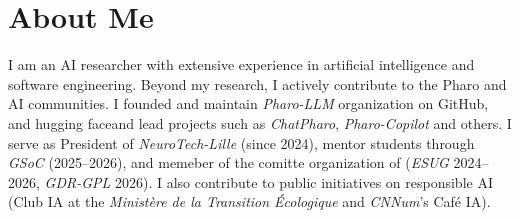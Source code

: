 \section{About Me}
I am an AI researcher with extensive experience in artificial intelligence and software engineering.
Beyond my research, I actively contribute to the Pharo and AI communities. I founded and maintain \textit{Pharo-LLM} organization on GitHub, and
hugging faceand lead projects such as \textit{ChatPharo}, \textit{Pharo-Copilot} and others. I serve as President of \textit{NeuroTech-Lille} (since 2024), 
mentor students through \textit{GSoC} (2025--2026), and memeber of the comitte organization of (\textit{ESUG} 2024--2026, \textit{GDR-GPL} 2026).
I also contribute to public initiatives on responsible AI (Club IA at the \textit{Ministère de la Transition Écologique} and \textit{CNNum}’s Café IA).